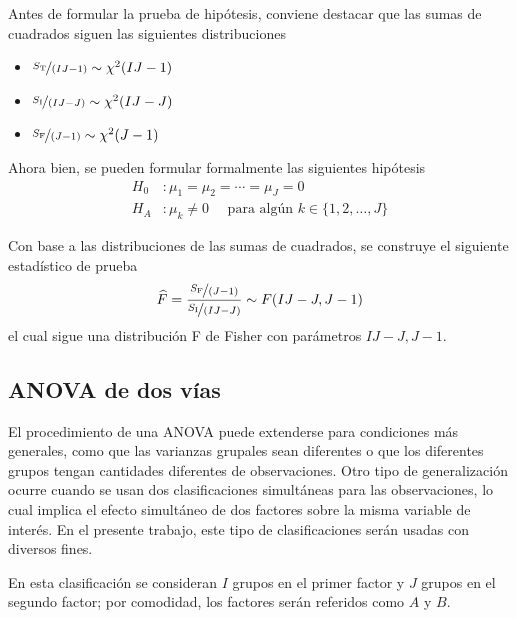 \documentclass[12pt,letterpaper]{book}
\begin{document}
Antes de formular la prueba de hipótesis, conviene destacar que las sumas de cuadrados siguen las siguientes distribuciones 
\begin{itemize}
\item $\nicefrac{S_{\text{T}}}{(I J - 1)} \sim \chi^2(I J - 1)$
\item $\nicefrac{S_{\text{I}}}{(I J - J)} \sim \chi^2(I J - J)$
\item $\nicefrac{S_{\text{F}}}{(J - 1)} \sim \chi^2(J - 1)$
\end{itemize}

Ahora bien, se pueden formular formalmente las siguientes hipótesis
\begin{align}
H_0 &: \mu_1 = \mu_2 = \cdots = \mu_J = 0 \\
H_A &: \mu_k \neq 0 \quad \text{ para algún } k \in \{ 1, 2, \dots, J \}
\end{align}

Con base a las distribuciones de las sumas de cuadrados, se construye el siguiente estadístico de prueba
\begin{equation}
\widehat{F} = \frac{\nicefrac{S_{\text{F}}}{(J - 1)}}{\nicefrac{S_{\text{I}}}{(I J - J)}}
\sim F(I J -J, J-1)
\end{equation}
el cual sigue una distribución F de Fisher con parámetros $I J -J, J-1$.


\subsection{ANOVA de dos vías}
\label{sec:ANOVA2}

El procedimiento de una ANOVA puede extenderse para condiciones más generales, como que las varianzas grupales sean diferentes o que los diferentes grupos tengan cantidades diferentes de observaciones.
%
Otro tipo de generalización ocurre cuando se usan dos clasificaciones simultáneas para las observaciones, lo cual implica el efecto simultáneo de dos factores sobre la misma variable de interés.
%
En el presente trabajo, este tipo de clasificaciones serán usadas con diversos fines.

En esta clasificación se consideran $I$ grupos en el primer factor y $J$ grupos en el segundo factor; por comodidad, los factores serán referidos como $A$ y $B$.
\end{document}
